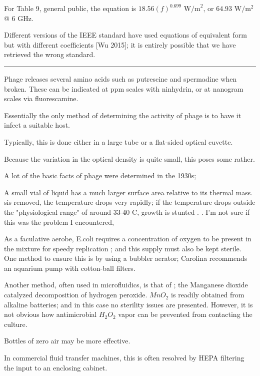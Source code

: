 \documentclass[paper.tex]{subfiles}
\begin{document}
For Table 9, general public, the equation is $18.56 (f)^{0.699} \text{ W/m}^2$, or $64.93 \text{ W}/\text{m}^2$ @ 6 GHz. 

Different versions of the IEEE standard have used equations of equivalent form but with different coefficients [Wu 2015]; it is entirely possible that we have retrieved the wrong standard.

\rule{\linewidth}{0.2pt}





Phage releases several amino acids such as putrescine and spermadine when broken. These can be indicated at ppm scales with ninhydrin, or at nanogram scales via fluorescamine.






Essentially the only method of determining the activity of phage is to have it infect a suitable host.

Typically, this is done either in a large tube or a flat-sided optical cuvette.

Because the variation in the optical density is quite small, this poses some rather. 

A lot of the basic facts of phage were determined in the 1930s; 

A small vial of liquid has a much larger surface area relative to its thermal mass. sis removed, the temperature drops very rapidly; if the temperature drops outside the "physiological range" of around 33-40 C, growth is stunted \cite{effect2003}. \cite{growth1946}. I'm not sure if this was the problem I encountered, 

As a faculative aerobe, E.coli requires a concentration of oxygen to be present in the mixture for speedy replication \cite{Effect1965}; and this supply must also be kept sterile. One method to ensure this is by using a bubbler aerator; Carolina recommends an aquarium pump with cotton-ball filters. 

Another method, often used in microfluidics\cite{Microfluidic}, is that of \cite{method1951}; the Manganese dioxide catalyzed decomposition of hydrogen peroxide. $MnO_2$ is readily obtained from alkaline batteries; and in this case no sterility issues are presented. However, it is not obvious how antimicrobial $H_2O_2$ vapor can be prevented from contacting the culture.

Bottles of zero air may be more effective.

In commercial fluid transfer machines, this is often resolved by HEPA filtering the input to an enclosing cabinet.
\end{document}
